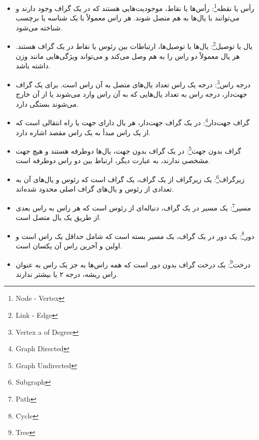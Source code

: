 \documentclass[a4paper,10pt]{book}
\begin{document}
            \begin{itemize}
                
                \item رأس یا نقطه\footnote{\hspace{2pt}Node - Vertex}: رأس‌ها یا نقاط، موجودیت‌هایی هستند که در یک گراف وجود دارند و می‌توانند با یال‌ها به هم متصل شوند. هر راس معمولاً با یک شناسه یا برچسب شناخته می‌شود.

                \item یال یا توصیل\footnote{\hspace{2pt}Link - Edge}: یال‌ها یا توصیل‌ها، ارتباطات بین رئوس یا نقاط در یک گراف هستند. هر یال معمولاً دو راس را به هم وصل می‌کند و می‌تواند ویژگی‌هایی مانند وزن داشته باشد.

                \item درجه راس\footnote{\hspace{2pt}Vertex a of Degree}: درجه یک راس تعداد یال‌های متصل به آن راس است. برای یک گراف جهت‌دار، درجه راس به تعداد یال‌هایی که به آن راس وارد می‌شوند یا از آن خارج می‌شوند بستگی دارد.

                \item گراف جهت‌دار\footnote{Graph Directed}: در یک گراف جهت‌دار، هر یال دارای جهت یا راه انتقالی است که از یک راس مبدأ به یک راس مقصد اشاره دارد.
                
                \item گراف بدون جهت\footnote{\hspace{2pt}Graph Undirected}: در یک گراف بدون جهت، یال‌ها دوطرفه هستند و هیچ جهت مشخصی ندارند، به عبارت دیگر، ارتباط بین دو راس دوطرفه است.

                \item زیرگراف\footnote{\hspace{2pt}Subgraph}: یک زیرگراف از یک گراف، یک گراف است که رئوس و یال‌های آن به تعدادی از رئوس و یال‌های گراف اصلی محدود شده‌اند.

                \item مسیر\footnote{\hspace{2pt}Path}: یک مسیر در یک گراف، دنباله‌ای از رئوس است که هر راس به راس بعدی از طریق یک یال متصل است.
                
                \item دور\footnote{\hspace{2pt}Cycle}: یک دور در یک گراف، یک مسیر بسته است که شامل حداقل یک راس است و اولین و آخرین راس آن یکسان است.
                
                \item درخت\footnote{\hspace{2pt}Tree}: یک درخت گراف بدون دور است که همه راس‌ها به جز یک راس به عنوان راس ریشه، درجه ۲ یا بیشتر ندارند.

            \end{itemize}
\end{document}
